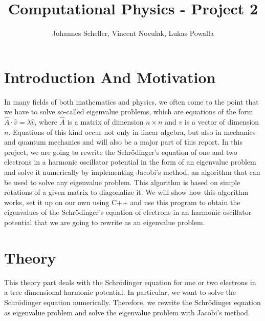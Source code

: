 \documentclass[10pt,a4paper]{article}
\author{Johannes Scheller, Vincent Noculak, Lukas Powalla}
\title{Computational Physics - Project 2}
\begin{document}
\maketitle
\newpage
\tableofcontents
\newpage
\section{Introduction And Motivation}
In many fields of both mathematics and physics, we often come to the point that we have to solve so-called eigenvalue problems, which are equations of the form $\hat{A}\cdot\hat{v}=\lambda\hat{v}$, where $\hat{A}$ is a matrix of dimension $n\times n$ and $v$ is a vector of dimension $n$. Equations of this kind occur not only in linear algebra, but also in mechanics and quantum mechanics and will also be a major part of this report. In this project, we are going to rewrite the Schrödinger's equation of one and two electrons in a harmonic oscillator potential in the form of an eigenvalue problem and solve it numerically by implementing Jacobi's method, an algorithm that can be used to solve any eigenvalue problem. This algorithm is based on simple rotations of a given matrix to diagonalize it. We will show how this algorithm works, set it up on our own using C++ and use this program to obtain the eigenvalues of the Schrödinger's equation of electrons in an harmonic oscillator potential that we are going to rewrite as an eigenvalue problem.

\section{Theory}
This theory part deals with the Schrödinger equation for one or two electrons in a tree dimensional harmonic potential. In particular, we want to solve the Schrödinger equation numerically. Therefore, we rewrite the Schrödinger equation as eigenvalue problem and solve the eigenvalue problem with Jacobi's method. 
\end{document}
